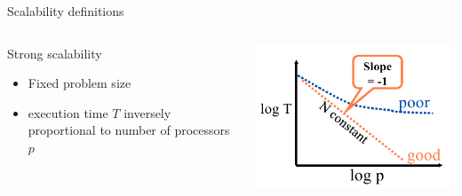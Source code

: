 \begin{frame}{Scalability definitions}
  \begin{columns}
    \begin{column}{0.5\textwidth}
      {\large Strong scalability}
      \begin{itemize}
      \item Fixed problem size
      \item execution time $T$ inversely proportional to number of processors $p$
      \end{itemize}
    \end{column}
    \begin{column}{0.5\textwidth}
      \includegraphics[width=\textwidth]{figures/KeyesStrongScaling.png}
    \end{column}
  \end{columns}


\end{frame}
